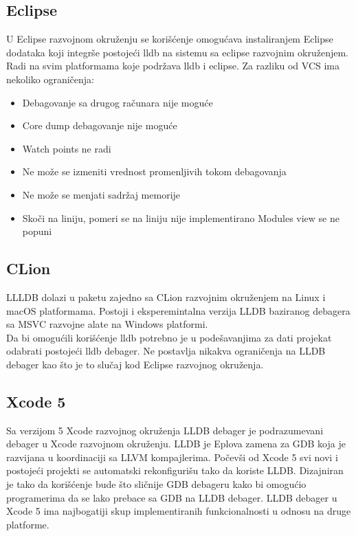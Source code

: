 \documentclass[a4paper]{article}
\begin{document}
\subsection{Eclipse}
U Eclipse razvojnom okruženju se korišćenje omogućava instaliranjem Eclipse dodataka koji integrše postojeći lldb na sistemu sa eclipse razvojnim okruženjem. Radi na svim platformama koje podržava lldb i eclipse. Za razliku od VCS ima nekoliko ograničenja:

\begin{itemize}
\item Debagovanje sa drugog računara nije moguće
\item Core dump debagovanje nije moguće
\item Watch points ne radi
\item Ne može se izmeniti vrednost promenljivih tokom debagovanja
\item Ne može se menjati sadržaj memorije
\item Skoči na liniju, pomeri se na liniju nije implementirano
Modules view se ne popuni
\end{itemize}

\subsection{CLion}
LLLDB dolazi u paketu zajedno sa CLion razvojnim okruženjem na Linux i macOS platformama. Postoji i eksperemintalna verzija LLDB baziranog debagera sa MSVC razvojne alate na Windows platformi. \\
\indent Da bi omogućili korišćenje lldb potrebno je u podešavanjima za dati projekat odabrati postojeći lldb debager. 
Ne postavlja nikakva ograničenja na LLDB debager kao što je to slučaj kod Eclipse razvojnog okruženja.

\subsection{Xcode 5}
Sa verzijom 5 Xcode razvojnog okruženja LLDB debager je podrazumevani debager u Xcode razvojnom okruženju. LLDB je Eplova zamena za GDB koja je razvijana u koordinaciji sa LLVM kompajlerima. Počevši od Xcode 5 svi novi i postojeći projekti se automatski rekonfigurišu tako da koriste LLDB. Dizajniran je tako da korišćenje bude što sličnije GDB debageru kako bi omogućio programerima da se lako prebace sa GDB na LLDB debager. LLDB debager u Xcode 5 ima najbogatiji skup implementiranih funkcionalnosti u odnosu na druge platforme.
\end{document}

